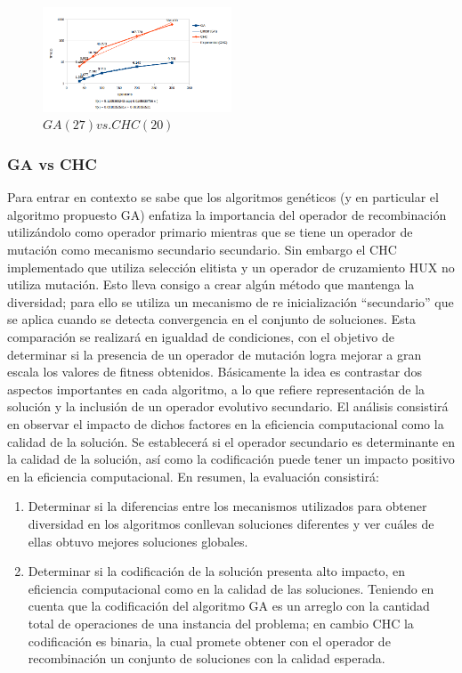 \documentclass[journal]{IEEEtran}
\begin{document}
\begin{figure}[]
  \centering
    \includegraphics[width=0.5\textwidth]{./figuras/Graficas/GAvsCHCTime.png}
  \caption{$GA(27) vs. CHC(20)$}
  \label{grafica:tiempo}
\end{figure} 



\subsubsection{GA vs CHC}
Para entrar en contexto se sabe que los algoritmos genéticos (y en particular el algoritmo propuesto GA) enfatiza la importancia del operador de recombinación utilizándolo como operador primario mientras que se tiene un operador de mutación como mecanismo secundario secundario.
Sin embargo el CHC implementado que utiliza selección elitista y un operador de cruzamiento HUX no utiliza mutación. Esto lleva consigo a crear algún método que mantenga la diversidad; para ello se utiliza un mecanismo de re inicialización “secundario” que se aplica cuando se detecta convergencia en el conjunto de soluciones.
Esta comparación se realizará en igualdad de condiciones, con el objetivo de determinar si la presencia de un operador de mutación logra mejorar a gran escala los valores de fitness obtenidos. Básicamente la idea es contrastar dos aspectos importantes en cada algoritmo, a lo que refiere representación de la solución y la inclusión de un operador evolutivo secundario. El análisis consistirá en observar el impacto de dichos factores en la eficiencia computacional como la calidad de la solución. Se establecerá si el operador secundario es determinante en la calidad de la solución, así como la codificación puede tener un impacto positivo en la eficiencia computacional.
En resumen, la evaluación consistirá:
\begin{enumerate}
  \item Determinar si la diferencias entre los mecanismos utilizados para obtener diversidad en los algoritmos conllevan soluciones diferentes y ver cuáles de ellas obtuvo mejores soluciones globales. 
  \item Determinar si la codificación de la solución presenta alto impacto, en eficiencia computacional como en la calidad de las soluciones. Teniendo en cuenta que la codificación del algoritmo GA es un arreglo con la cantidad total de operaciones de una instancia del problema; en cambio CHC la codificación es binaria, la cual promete obtener con el operador de recombinación un conjunto de soluciones con la calidad esperada.
\end{enumerate}
\end{document}
